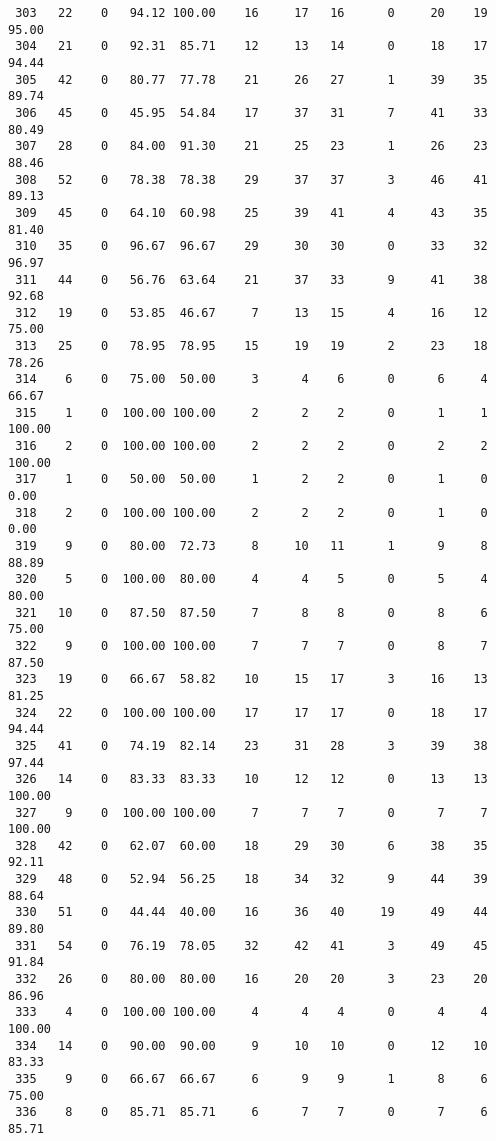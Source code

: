 \begin{verbatim}
 303   22    0   94.12 100.00    16     17   16      0     20    19    95.00
 304   21    0   92.31  85.71    12     13   14      0     18    17    94.44
 305   42    0   80.77  77.78    21     26   27      1     39    35    89.74
 306   45    0   45.95  54.84    17     37   31      7     41    33    80.49
 307   28    0   84.00  91.30    21     25   23      1     26    23    88.46
 308   52    0   78.38  78.38    29     37   37      3     46    41    89.13
 309   45    0   64.10  60.98    25     39   41      4     43    35    81.40
 310   35    0   96.67  96.67    29     30   30      0     33    32    96.97
 311   44    0   56.76  63.64    21     37   33      9     41    38    92.68
 312   19    0   53.85  46.67     7     13   15      4     16    12    75.00
 313   25    0   78.95  78.95    15     19   19      2     23    18    78.26
 314    6    0   75.00  50.00     3      4    6      0      6     4    66.67
 315    1    0  100.00 100.00     2      2    2      0      1     1   100.00
 316    2    0  100.00 100.00     2      2    2      0      2     2   100.00
 317    1    0   50.00  50.00     1      2    2      0      1     0     0.00
 318    2    0  100.00 100.00     2      2    2      0      1     0     0.00
 319    9    0   80.00  72.73     8     10   11      1      9     8    88.89
 320    5    0  100.00  80.00     4      4    5      0      5     4    80.00
 321   10    0   87.50  87.50     7      8    8      0      8     6    75.00
 322    9    0  100.00 100.00     7      7    7      0      8     7    87.50
 323   19    0   66.67  58.82    10     15   17      3     16    13    81.25
 324   22    0  100.00 100.00    17     17   17      0     18    17    94.44
 325   41    0   74.19  82.14    23     31   28      3     39    38    97.44
 326   14    0   83.33  83.33    10     12   12      0     13    13   100.00
 327    9    0  100.00 100.00     7      7    7      0      7     7   100.00
 328   42    0   62.07  60.00    18     29   30      6     38    35    92.11
 329   48    0   52.94  56.25    18     34   32      9     44    39    88.64
 330   51    0   44.44  40.00    16     36   40     19     49    44    89.80
 331   54    0   76.19  78.05    32     42   41      3     49    45    91.84
 332   26    0   80.00  80.00    16     20   20      3     23    20    86.96
 333    4    0  100.00 100.00     4      4    4      0      4     4   100.00
 334   14    0   90.00  90.00     9     10   10      0     12    10    83.33
 335    9    0   66.67  66.67     6      9    9      1      8     6    75.00
 336    8    0   85.71  85.71     6      7    7      0      7     6    85.71

\end{verbatim}
